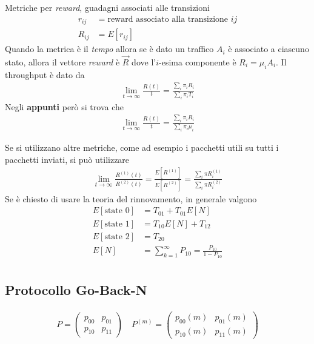 \documentclass{article}
\begin{document}
Metriche per \emph{reward}, guadagni associati alle transizioni
\begin{align*}
r_{ij} &= \text{reward associato alla transizione $ij$}\\
R_{ij} &= E[r_{ij}]
\end{align*}
Quando la metrica è il \emph{tempo} allora 
se è dato un traffico $A_i$ è associato a ciascuno stato, allora il vettore \emph{reward} è $\vec{R}$ dove l'$i$-esima componente è $R_i = \mu_i A_i$.
Il throughput è dato da
\begin{align*}
\lim_{t\to \infty} \frac{R(t)}{t} = \frac{\sum_i \pi_i R_i}{\sum_i \pi_i T_i}
\end{align*}
Negli \textbf{appunti} però si trova che
\begin{align*}
\lim_{t\to \infty} \frac{R(t)}{t} = \frac{\sum_i \pi_i R_i}{\sum_i \pi_i \mu_i}
\end{align*}

Se si utilizzano altre metriche, come ad esempio i pacchetti utili su tutti i pacchetti inviati, si può utilizzare
\begin{align*}
\lim_{t\to\infty} \frac{R^{(1)}(t)}{R^{(2)}(t)} = \frac{E[R^{(1)}]}{E[R^{(2)}]} = \frac{\sum_i \pi R_i^{(1)}}{\sum_i \pi R_i^{(2)}}
\end{align*}
Se è chiesto di usare la teoria del rinnovamento, in generale valgono
\begin{align*}
E[\text{state } 0] &= T_{01} + T_{01}E[N]\\
E[\text{state } 1] &= T_{10} E[N] + T_{12}\\
E[\text{state } 2] &= T_{20}\\
E[N] &= \sum_{k=1}^{\infty} P_{10} = \frac{P_{10}}{1-P_{10}}\\
\end{align*}

\subsection{Protocollo Go-Back-N}

\begin{align*}
P = \left(\begin{array}{cc}
p_{00} & p_{01}\\
p_{10} & p_{11}
\end{array}\right)\quad
P^{(m)} = \left(\begin{array}{cc}
p_{00}(m) & p_{01}(m)\\
p_{10}(m) & p_{11}(m)
\end{array}\right)
\end{align*}
\end{document}
